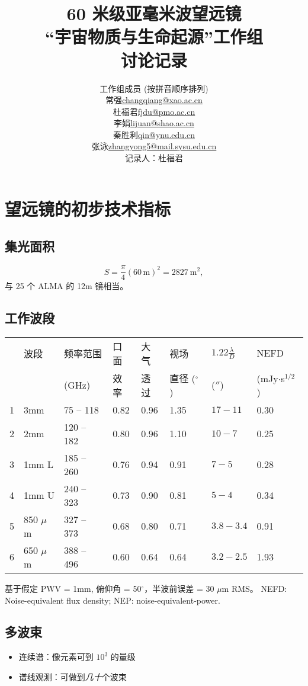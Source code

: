 \documentclass{article}
\title{60 米级亚毫米波望远镜 \\ {“宇宙物质与生命起源”工作组} \\ {讨论记录}}
\author{
\begin{tabular}{ll}
\hline
\multicolumn{2}{c}{工作组成员 (按拼音顺序排列)} \\
常强 & \url{changqiang@xao.ac.cn} \\
杜福君 & \url{fjdu@pmo.ac.cn} \\
李娟 & \url{lijuan@shao.ac.cn} \\
秦胜利 & \url{qin@ynu.edu.cn} \\
张泳 & \url{zhangyong5@mail.sysu.edu.cn} \\
\hline
\multicolumn{2}{c}{记录人：杜福君} \\
\hline
\end{tabular}
}
\begin{document}
\maketitle

\section{望远镜的初步技术指标}

\subsection{集光面积}
\begin{equation}
  S = \frac{\pi}{4} (60\,\text{m})^2 = 2827~\text{m}^2,
\end{equation}
与 25 个 ALMA 的 12m 镜相当。

\subsection{工作波段}

\noindent\begin{tabular}{l|l|l|l|l|l|l|l}
  & 波段 & 频率范围 & 口面 & 大气 & 视场 & $1.22\frac{\lambda}{D}$ & NEFD \\
  &      & (GHz) & 效率 & 透过 & 直径 ($^\circ$)  & ($''$) & (mJy$\cdot$s$^{1/2}$) \\
\hline
1 & 3mm & 75 -- 118 & 0.82         & 0.96 & 1.35 & $17-11$   & 0.30 \\
2 & 2mm & 120 -- 182 & 0.80        & 0.96 & 1.10 & $10-7$    & 0.25 \\
3 & 1mm L & 185 -- 260 & 0.76      & 0.94 & 0.91 & $7-5$     & 0.28 \\
4 & 1mm U & 240 -- 323 & 0.73      & 0.90 & 0.81 & $5-4$     & 0.34 \\
5 & 850 $\mu$m & 327 -- 373 & 0.68 & 0.80 & 0.71 & $3.8-3.4$ & 0.91 \\
6 & 650 $\mu$m & 388 -- 496 & 0.60 & 0.64 & 0.64 & $3.2-2.5$ & 1.93
\end{tabular}
基于假定 PWV = {1}mm, 俯仰角 = 50$^\circ$，半波前误差 = 30 $\mu$m RMS。
NEFD: Noise-equivalent flux density;
NEP: noise-equivalent-power.


\subsection{多波束}
\begin{itemize}
  \item 连续谱：像元素可到 $10^3$ 的量级
  \item 谱线观测：可做到\emph{几十}个波束
\end{itemize}
\end{document}

